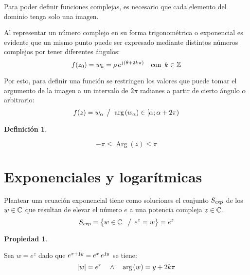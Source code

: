 \documentclass[a5paper,12pt,twoside]{book}
\newtheorem{defn}{{Definición}}[chapter]
\newtheorem{prop}{{Propiedad}}[chapter]
\begin{document}
Para poder definir funciones complejas, es necesario que cada elemento del dominio tenga solo una imagen.

Al representar un número complejo en su forma trigonométrica o exponencial es evidente que un mismo punto puede ser expresado mediante distintos números complejos por tener diferentes ángulos:
\begin{equation*}
    f(z_0) = w_k = \rho \, e^{\mkern2mu\mathrm{j}\mkern1mu \left( \theta + 2 k \pi \right)} \quad \textrm{con} \enspace k \in \mathbb{Z}
\end{equation*}

Por esto, para definir una función se restringen los valores que puede tomar el argumento de la imagen a un intervalo de $2\pi$ radianes a partir de cierto ángulo $\alpha$ arbitrario:
\begin{equation*}
    f(z) = w_\alpha \hspace{1ex} \big/ \hspace{1ex} \mathop{\mathrm{arg}}\mkern2mu(w_\alpha) \in [\alpha;\alpha+2\pi)
\end{equation*}

\begin{mdframed}[style=DefinitionFrame]
    \begin{defn}
    \end{defn}
    \begin{equation*}
        -\pi \leq \operatorname{Arg}(z) \leq \pi
    \end{equation*}
\end{mdframed}


\section{Exponenciales y logarítmicas}

Plantear una ecuación exponencial tiene como soluciones el conjunto ${{S}_\textsl{{exp}}}$ de los $w \in \mathbb{C}$ que resultan de elevar el número $e$ a una potencia compleja $z \in \mathbb{C}$.
\begin{equation*}
    {{S}_\textsl{{exp}}} = { \left\{ {w \in \mathbb{C}\ \hspace{1ex} \big/ \hspace{1ex} e^z = w} \right\} } = e^z
\end{equation*}

\begin{mdframed}[style=PropertyFrame]
    \begin{prop}
    \end{prop}
    Sea $w = e^z$ dado que $e^{x + \mkern2mu\mathrm{j}\mkern1mu y} = e^x \, e^{\mkern2mu\mathrm{j}\mkern1mu y}$ se tiene:
    \begin{equation*}
        {\left| {w} \right|} = e^x \quad \land \quad \mathop{\mathrm{arg}}\mkern2mu(w) = y + 2 k \pi
    \end{equation*}
\end{mdframed}
\end{document}
